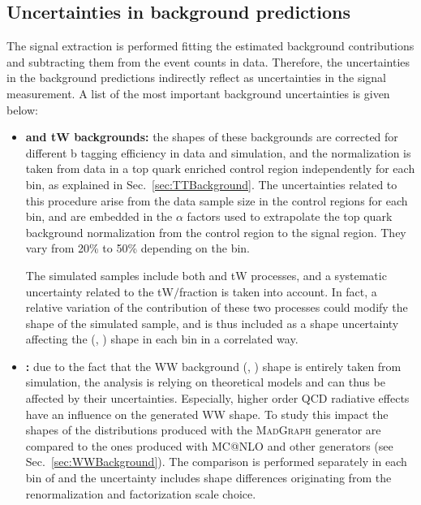 \subsection{Uncertainties in background predictions}

The signal extraction is performed fitting the estimated background contributions and subtracting them from the event counts in data. Therefore, the uncertainties in the background predictions indirectly reflect as uncertainties in the signal measurement. A list of the most important background uncertainties is given below:

\begin{itemize}
\item {\bf\boldmath \ttbar and tW backgrounds:}    
the shapes of these backgrounds are corrected for different b tagging efficiency in data and simulation, and the normalization is taken from data in a top quark enriched control region independently for each \pth bin, as explained in Sec.~\ref{sec:TTBackground}. The uncertainties related to this procedure arise from the data sample size in the control regions for each \pth bin, and are embedded in the $\alpha$ factors used to extrapolate the top quark background normalization from the control region to the signal region. They vary from 20\% to 50\% depending on the \pth bin.
 
The simulated samples include both \ttbar and tW processes, and a systematic uncertainty related to the tW$/$\ttbar fraction is taken into account.
In fact, a relative variation of the contribution of these two processes could modify the shape of the simulated sample, and is thus included as a shape uncertainty affecting the (\mll, \mt) shape in each \pth bin in a correlated way. 

\item {\bf {}:} 
due to the fact that the WW background (\mll, \mt) shape is entirely taken from simulation, the analysis is relying on theoretical models and can thus be affected by their uncertainties. Especially, higher order QCD radiative effects have an influence on the generated WW shape. To study this impact the shapes of the distributions produced with the \textsc{MadGraph} generator are compared to the ones produced with \textsc{MC@NLO} and other generators (see Sec.~\ref{sec:WWBackground}). The comparison is performed separately in each bin of \pth and the uncertainty includes shape differences originating from the renormalization and factorization scale choice. 
  

\end{itemize}
